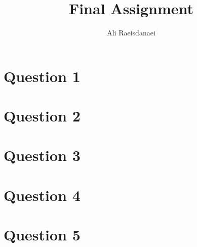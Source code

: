 \documentclass{article}
\begin{document}


\title{Final Assignment}
\author{Ali Raeisdanaei}
\maketitle

\section{Question 1}


\section{Question 2}


\section{Question 3}


\section{Question 4}


\section{Question 5}


\printbibliography
\end{document}
